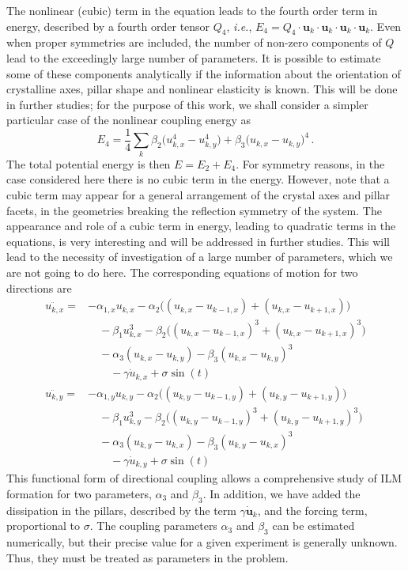 \documentclass[12pt]{report}
\begin{document}
The nonlinear (cubic) term in the equation leads to the fourth order term in energy, described by a fourth order tensor 
$Q_4$, \emph{i.e.}, $E_4=Q_4 \cdot \mathbf{u}_k \cdot \mathbf{u}_k\cdot \mathbf{u}_k\cdot \mathbf{u}_k$. Even when proper symmetries are included, the number of non-zero components of $Q$ lead to the exceedingly large number of parameters. It is possible to estimate some of these components analytically if the information about the orientation of crystalline axes, pillar shape and nonlinear elasticity is known. This will be done in further studies; for the purpose of this work, we shall consider a simpler particular case of the nonlinear coupling energy as 
\begin{equation} 
E_4=\frac{1}{4} \sum_k \beta_2 \Big(  u_{k,x}^4 - u_{k,y}^4 \Big)+ \beta_3 \Big( u_{k,x} - u_{k,y}  \big)^4 \, . 
\label{E4}
\end{equation} 
The total potential energy is then $E=E_2+E_4$. For symmetry reasons, in the case considered here there is no cubic term in the energy. However, note that a cubic term may appear for a general arrangement of the crystal axes and pillar facets, in the geometries breaking the reflection symmetry of the system.  The appearance and role of a cubic term in energy, leading to quadratic terms in the equations, is very interesting and will be addressed in further studies.  This will lead to the necessity of investigation of a large number of parameters, which we are not going to do here. The corresponding equations of motion for two directions are 
\begin{align} 
\ddot{u_{k,x}} = &-\alpha_{1,x} u_{k,x} - \alpha_2 \big( (u_{k,x}- u_{k-1,x}) + (u_{k,x}-u_{k+1,x})\big) \nonumber \\
& \quad- \beta_1 u_{k,x}^3  - \beta_2 \big( (u_{k,x}-u_{k-1,x})^3+(u_{k,x}-u_{k+1,x})^3 \big) \nonumber  \\
&\quad- \alpha_3 (u_{k,x}- u_{k,y}) - \beta_3 (u_{k,x} - u_{k,y})^3  \nonumber \\
&\quad \quad  -\gamma \dot{u}_{k,x} + \sigma \sin (t) 
\label{2Dx} \\
\ddot{u_{k,y}} = &-\alpha_{1,y} u_{k,y} - \alpha_2 \big( (u_{k,y}- u_{k-1,y}) + (u_{k,y}-u_{k+1,y})\big) \nonumber \\
&\quad - \beta_1 u_{k,y}^3  - \beta_2 \big( (u_{k,y}-u_{k-1,y})^3+(u_{k,y}-u_{k+1,y})^3 \big) \nonumber  \\
&\quad -\alpha_3 (u_{k,y} - u_{k,x}) - \beta_3 (u_{k,y} - u_{k,x})^3  \nonumber \\ 
&\quad \quad  -\gamma \dot{u}_{k,y} + \sigma \sin (t)
\label{2Dy} 
\end{align} 
This functional form of directional coupling allows a comprehensive study of ILM formation for two parameters, 
$\alpha_3$ and $\beta_3$. %
In addition, we have added the dissipation in the pillars, described by the term $\gamma \dot{\mathbf{u}}_{k}$, and the forcing term, proportional to $\sigma$. The coupling parameters $\alpha_3$ and $\beta_3$ can be estimated numerically, but their precise value for a given experiment is generally unknown. Thus, they must be treated as parameters in the problem.    
\end{document}
